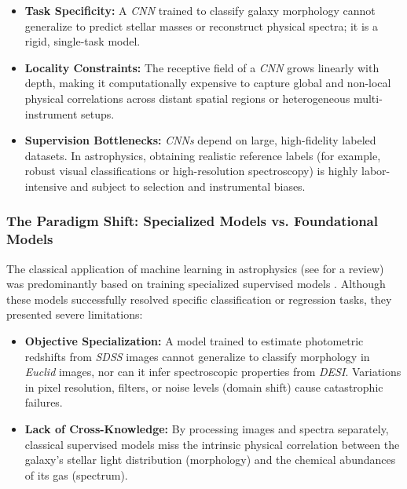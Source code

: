 \begin{itemize}
  \item \textbf{Task Specificity:} A \textit{\gls{CNN}} trained to classify galaxy morphology cannot generalize to predict stellar masses or reconstruct physical spectra; it is a rigid, single-task model.
  \item \textbf{Locality Constraints:} The receptive field of a \textit{\gls{CNN}} grows linearly with depth, making it computationally expensive to capture global and non-local physical correlations across distant spatial regions or heterogeneous multi-instrument setups.
  \item \textbf{Supervision Bottlenecks:} \textit{\glspl{CNN}} depend on large, high-fidelity labeled datasets. In astrophysics, obtaining realistic reference labels (for example, robust visual classifications or high-resolution spectroscopy) is highly labor-intensive and subject to selection and instrumental biases.
\end{itemize}

\subsubsection{The Paradigm Shift: Specialized Models vs. Foundational Models}

The classical application of machine learning in astrophysics (see \textcite{ar:huertas-company-2023} for a review) was predominantly based on training specialized supervised models \autocites{ar:huertas-company-2015}{ar:dominguez-sanchez-2018}. Although these models successfully resolved specific classification or regression tasks, they presented severe limitations:

\begin{itemize} \item \textbf{Objective Specialization:} A model trained to estimate photometric redshifts from \textit{\gls{SDSS}} images cannot generalize to classify morphology in \textit{Euclid} images, nor can it infer spectroscopic properties from \textit{\gls{DESI}}. Variations in pixel resolution, filters, or noise levels (domain shift) cause catastrophic failures. \item \textbf{Lack of Cross-Knowledge:} By processing images and spectra separately, classical supervised models miss the intrinsic physical correlation between the galaxy's stellar light distribution (morphology) and the chemical abundances of its gas (spectrum). \end{itemize}

